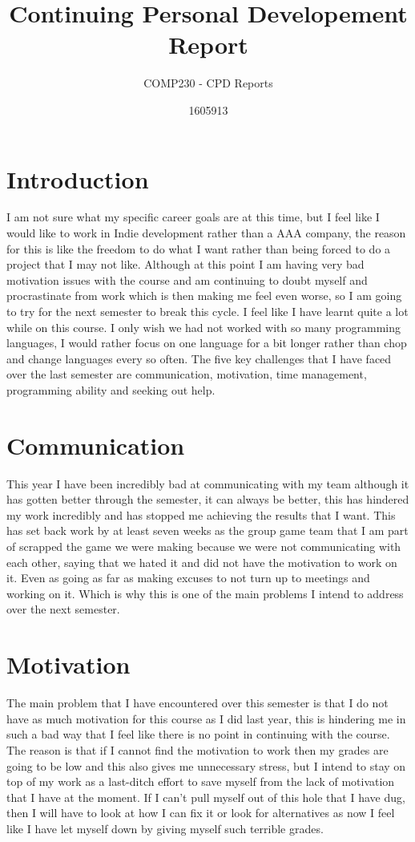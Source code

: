 \documentclass[11pt]{scrartcl}
\title{Continuing Personal Developement Report}
\subtitle{COMP230 - CPD Reports}
\author{1605913}
\begin{document}
\maketitle


\section*{Introduction}

I am not sure what my specific career goals are at this time, but I feel like I would like to work in Indie development rather than a AAA company, the reason for this is like the freedom to do what I want rather than being forced to do a project that I may not like. Although at this point I am having very bad motivation issues with the course and am continuing to doubt myself and procrastinate from work which is then making me feel even worse, so I am going to try for the next semester to break this cycle.
I feel like I have learnt quite a lot while on this course. I only wish we had not worked with so many programming languages, I would rather focus on one language for a bit longer rather than chop and change languages every so often. The five key challenges that I have faced over the last semester are communication, motivation, time management, programming ability and seeking out help. 

\section{Communication}
This year I have been incredibly bad at communicating with my team although it has gotten better through the semester, it can always be better, this has hindered my work incredibly and has stopped me achieving the results that I want. This has set back work by at least seven weeks as the group game team that I am part of scrapped the game we were making because we were not communicating with each other,  saying that we hated it and did not have the motivation to work on it. Even as going as far as making excuses to not turn up to meetings and working on it. Which is why this is one of the main problems I intend to address over the next semester.

\section{Motivation}
The main problem that I have encountered over this semester is that I do not have as much motivation for this course as I did last year, this is hindering me in such a bad way that I feel like there is no point in continuing with the course. The reason is that if I cannot find the motivation to work then my grades are going to be low and this also gives me unnecessary stress, but I intend to stay on top of my work as a last-ditch effort to save myself from the lack of motivation that I have at the moment. If I can't pull myself out of this hole that I have dug, then I will have to look at how I can fix it or look for alternatives as now I feel like I have let myself down by giving myself such terrible grades.
\end{document}
